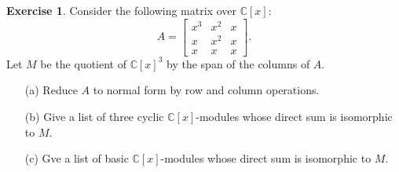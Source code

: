 \documentclass{amsart}
\newcommand{\bbm}       {\left[\begin{matrix}}
\newcommand{\ebm}       {\end{matrix}\right]}
\newcommand{\C}         {{\mathbb{C}}}
\newcommand{\ip}[1]     {\langle #1\rangle}
\renewcommand{\:}{\colon}
\theoremstyle{definition}
\newtheorem{exercise}{Exercise}[section]
\begin{document}
\begin{exercise}
 Consider the following matrix over $\C[x]$:
 \[ A = \bbm x^3 & x^2 & x \\ x & x^2 & x \\ x & x & x \ebm. \]
 Let $M$ be the quotient of $\C[x]^3$ by the span of the columns of
 $A$. 
 \begin{itemize}
  \item[(a)] Reduce $A$ to normal form by row and column operations.
  \item[(b)] Give a list of three cyclic $\C[x]$-modules whose direct
   sum is isomorphic to $M$.
  \item[(c)] Gve a list of basic $\C[x]$-modules whose direct sum is
   isomorphic to $M$.
 \end{itemize}
\end{exercise}
\end{document}
